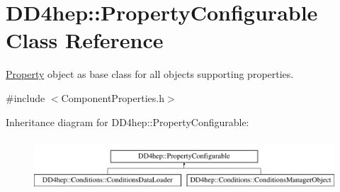 \hypertarget{class_d_d4hep_1_1_property_configurable}{}\section{D\+D4hep\+:\+:Property\+Configurable Class Reference}
\label{class_d_d4hep_1_1_property_configurable}


\hyperlink{class_d_d4hep_1_1_property}{Property} object as base class for all objects supporting properties.  




{\ttfamily \#include $<$Component\+Properties.\+h$>$}

Inheritance diagram for D\+D4hep\+:\+:Property\+Configurable\+:\begin{figure}[H]
\begin{center}
\leavevmode
\includegraphics[height=1.971831cm]{class_d_d4hep_1_1_property_configurable}
\end{center}
\end{figure}
